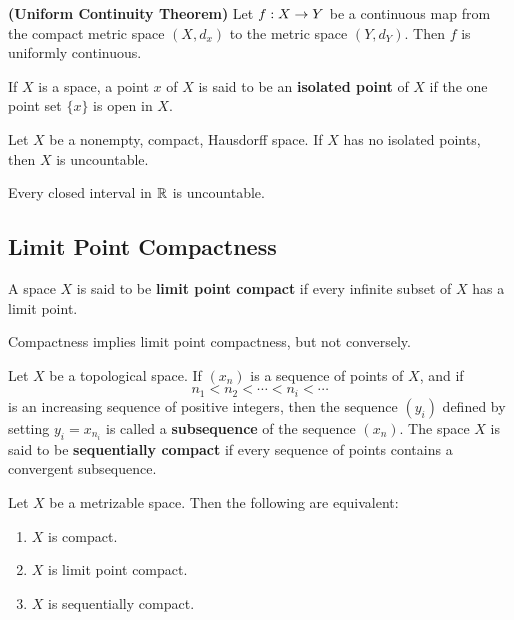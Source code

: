 \vs

\begin{thm}\textbf{(Uniform Continuity Theorem)}
Let $f:X\rightarrow Y$ be a continuous map from the compact metric space $(X, d_x)$ to the metric space $(Y, d_Y)$. Then $f$ is uniformly continuous.
\end{thm}

\vs

\dfn If $X$ is a space, a point $x$ of $X$ is said to be an \textbf{isolated point} of $X$ if the one point set $\{x\}$ is open in $X$.

\vs

\begin{thm}
Let $X$ be a nonempty, compact, Hausdorff space. If $X$ has no isolated points, then $X$ is uncountable.
\end{thm}

\vs

\begin{cor}
Every closed interval in $\mathbb{R}$ is uncountable.
\end{cor}

\subsection{Limit Point Compactness}\nl
\setcounter{section}{28}
\setcounter{thm}{0}

\vs

\dfn A space $X$ is said to be \textbf{limit point compact} if every infinite subset of $X$ has a limit point.

\vs

\begin{thm}
Compactness implies limit point compactness, but not conversely.
\end{thm}

\vs

\dfn Let $X$ be a topological space. If $(x_n)$ is a sequence of points of $X$, and if
\[n_1 < n_2 < \cdots < n_i < \cdots\]
is an increasing sequence of positive integers, then the sequence $(y_i)$ defined by setting $y_i = x_{n_i}$ is called a \textbf{subsequence} of the sequence $(x_n)$. The space $X$ is said to be \textbf{sequentially compact} if every sequence of points contains a convergent subsequence.

\vs

\begin{thm}
Let $X$ be a metrizable space. Then the following are equivalent:
\begin{enumerate}
    \item $X$ is compact.
    \item $X$ is limit point compact.
    \item $X$ is sequentially compact.
\end{enumerate}
\end{thm}


























